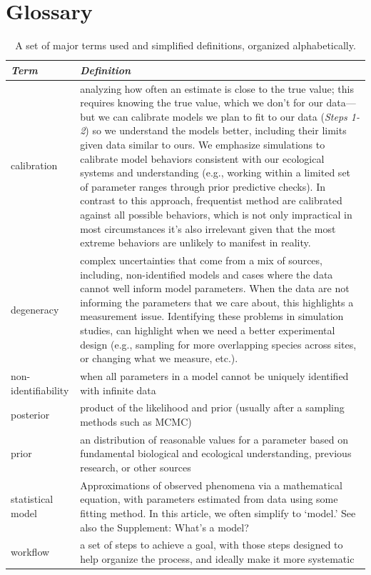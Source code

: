 \documentclass[11pt]{article}
\begin{document}
{\clearpage

\section{Glossary}


\begin{table}
\caption{A set of major terms used and simplified definitions, organized alphabetically.}
\begin{tabular}{ p{3 cm}  p{12 cm} }  \hline \hline
 \emph{Term}   & \emph{Definition}\\ 
\hline \hline
calibration & analyzing how often an estimate is close to the true value; this requires knowing the true value, which we don't for our data---but we can calibrate models we plan to fit to our data (\emph{Steps 1-2}) so we understand the models better, including their limits given data similar to ours. We emphasize simulations to calibrate model behaviors consistent with our ecological systems and understanding (e.g., working within a limited set of parameter ranges through prior predictive checks). In contrast to this approach, frequentist method are calibrated against all possible behaviors, which is not only impractical in most circumstances it’s also irrelevant given that the most extreme behaviors are unlikely to manifest in reality. \\\hline
degeneracy & complex uncertainties that come from a mix of sources, including, non-identified models and cases where the data cannot well inform model parameters. When the data are not informing the parameters that we care about, this highlights a measurement issue. Identifying these problems in simulation studies, can highlight when we need a better experimental design (e.g., sampling for more overlapping species across sites, or changing what we measure, etc.).  \\\hline
non-identifiability & when all parameters in a model cannot be uniquely identified with infinite data \\\hline
posterior & product of the likelihood and prior (usually after a sampling methods such as MCMC) \\\hline
prior & an distribution of reasonable values for a parameter based on fundamental biological and ecological understanding, previous research, or other sources \\\hline
statistical model & Approximations of observed phenomena via a mathematical equation, with parameters estimated from data using some fitting method. In this article, we often simplify to `model.' See also the Supplement: What's a model? \\\hline
workflow & a set of steps to achieve a goal, with those steps designed to help organize the process, and ideally make it more systematic  \\\hline
\hline
\end{tabular}
\label{tab:glossary}
\end{table}


}
\end{document}
